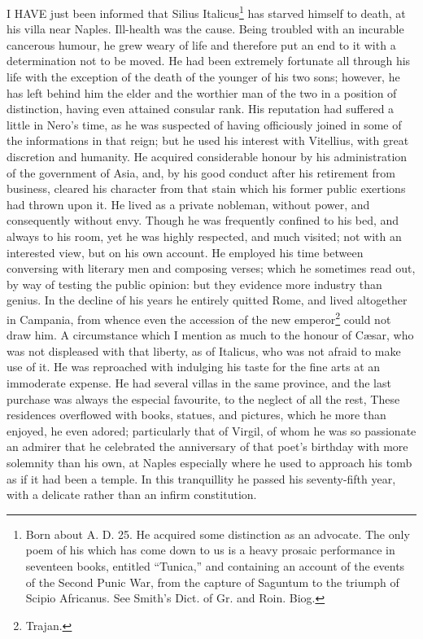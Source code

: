 I HAVE just been informed that Silius Italicus\footnote{Born about A. D. 25. He
acquired some distinction as an advocate. The only poem of his which has
come down to us is a heavy prosaic performance in seventeen books,
entitled ``Tunica,'' and containing an account of the events of the Second
Punic War, from the capture of Saguntum to the triumph of Scipio
Africanus. See Smith's Dict. of Gr. and Roin. Biog.} has starved himself to
death, at his villa near Naples. Ill-health was the cause. Being troubled
with an incurable cancerous humour, he grew weary of life and therefore
put an end to it with a determination not to be moved. He had been
extremely fortunate all through his life with the exception of the death
of the younger of his two sons; however, he has left behind him the elder
and the worthier man of the two in a position of distinction, having even
attained consular rank. His reputation had suffered a little in Nero's
time, as he was suspected of having officiously joined in some of the
informations in that reign; but he used his interest with Vitellius, with
great discretion and humanity. He acquired considerable honour by his
administration of the government of Asia, and, by his good conduct after
his retirement from business, cleared his character from that stain which
his former public exertions had thrown upon it. He lived as a private
nobleman, without power, and consequently without envy. Though he was
frequently confined to his bed, and always to his room, yet he was highly
respected, and much visited; not with an interested view, but on his own
account. He employed his time between conversing with literary men and
composing verses; which he sometimes read out, by way of testing the
public opinion: but they evidence more industry than genius. In the
decline of his years he entirely quitted Rome, and lived altogether in
Campania, from whence even the accession of the new emperor\footnote{Trajan.}
could not draw him. A circumstance which I mention as much to the honour
of Cæsar, who was not displeased with that liberty, as of Italicus, who
was not afraid to make use of it. He was reproached with indulging his
taste for the fine arts at an immoderate expense. He had several villas in
the same province, and the last purchase was always the especial
favourite, to the neglect of all the rest, These residences overflowed
with books, statues, and pictures, which he more than enjoyed, he even
adored; particularly that of Virgil, of whom he was so passionate an
admirer that he celebrated the anniversary of that poet's birthday with
more solemnity than his own, at Naples especially where he used to
approach his tomb as if it had been a temple. In this tranquillity he
passed his seventy-fifth year, with a delicate rather than an infirm
constitution.

